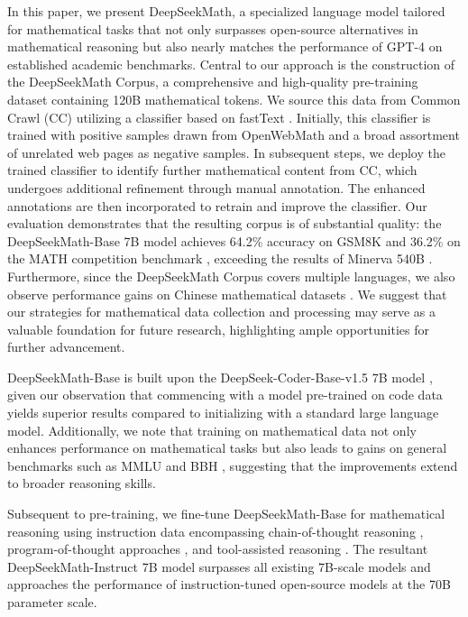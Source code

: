 In this paper, we present DeepSeekMath, a specialized language model tailored for mathematical tasks that not only surpasses open-source alternatives in mathematical reasoning but also nearly matches the performance of GPT-4 on established academic benchmarks. Central to our approach is the construction of the DeepSeekMath Corpus, a comprehensive and high-quality pre-training dataset containing 120B mathematical tokens. We source this data from Common Crawl (CC) utilizing a classifier based on fastText \citep{joulin2016fasttext}. Initially, this classifier is trained with positive samples drawn from OpenWebMath \citep{openwebmath} and a broad assortment of unrelated web pages as negative samples. In subsequent steps, we deploy the trained classifier to identify further mathematical content from CC, which undergoes additional refinement through manual annotation. The enhanced annotations are then incorporated to retrain and improve the classifier. Our evaluation demonstrates that the resulting corpus is of substantial quality: the DeepSeekMath-Base 7B model achieves 64.2\% accuracy on GSM8K \citep{gsm8k} and 36.2\% on the MATH competition benchmark \citep{MATH}, exceeding the results of Minerva 540B \citep{minerva}. Furthermore, since the DeepSeekMath Corpus covers multiple languages, we also observe performance gains on Chinese mathematical datasets \citep{wei2023cmath,agieval}. We suggest that our strategies for mathematical data collection and processing may serve as a valuable foundation for future research, highlighting ample opportunities for further advancement.

DeepSeekMath-Base is built upon the DeepSeek-Coder-Base-v1.5 7B model \citep{deepseek-coder}, given our observation that commencing with a model pre-trained on code data yields superior results compared to initializing with a standard large language model. Additionally, we note that training on mathematical data not only enhances performance on mathematical tasks but also leads to gains on general benchmarks such as MMLU \citep{mmlu} and BBH \citep{bbh}, suggesting that the improvements extend to broader reasoning skills.

Subsequent to pre-training, we fine-tune DeepSeekMath-Base for mathematical reasoning using instruction data encompassing chain-of-thought reasoning \citep{cot}, program-of-thought approaches \citep{pot,pal}, and tool-assisted reasoning \citep{tora}. The resultant DeepSeekMath-Instruct 7B model surpasses all existing 7B-scale models and approaches the performance of instruction-tuned open-source models at the 70B parameter scale.

